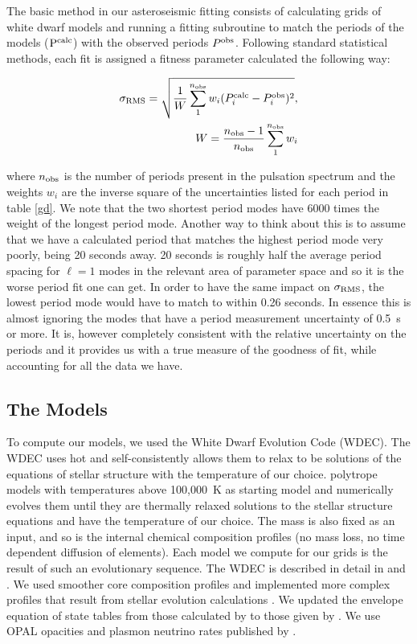 \documentclass[12pt,preprint]{aastex}
\begin{document}
The basic method in our asteroseismic fitting consists of calculating grids of white dwarf models and 
running a fitting subroutine to match the periods of the models ($\rm P^{calc}$) with the observed 
periods $P^{\rm obs}$. Following standard statistical methods, each fit is assigned a fitness 
parameter calculated the following way:

\begin{eqnarray}
\label{fiteq1}
\sigma_{\rm RMS} = \sqrt{\frac{1}{W} \sum_{1}^{n_{\rm obs}} {w_i(P^{\rm calc}_i-P^{\rm obs}_i)^2}}, \\
W=\frac{n_{\rm obs}-1}{n_{\rm obs}}\sum_{1}^{n_{\rm obs}}w_i
\end{eqnarray}

\noindent where $n_{\rm obs}$ is the number of periods present in the pulsation spectrum and the weights $w_i$ 
are the inverse square of the uncertainties listed for each period in table \ref{gd}. We note that the two 
shortest period modes have 6000 times the weight of the longest period mode. Another way to think about this 
is to assume that we have a calculated period that matches the highest period mode very poorly, 
being 20 seconds away. 20 seconds is roughly half the average period spacing for $\ell=1$ modes in the 
relevant area of parameter space and so it is the worse period fit one can get. In order to have the 
same impact on $\sigma_{\rm RMS}$, the lowest period mode would have to match to within 0.26 seconds. 
In essence this is almost ignoring the modes that have a period measurement uncertainty of 0.5~s or more. 
It is, however completely consistent with the relative uncertainty on the periods and it provides us with 
a true measure of the goodness of fit, while accounting for all the data we have.

\subsection{The Models}
\label{models}

To compute our models, we used the White Dwarf Evolution Code (WDEC). The WDEC uses hot  and self-consistently allows them to relax to be solutions of the equations of stellar structure with the temperature of our choice.
polytrope models with temperatures above 100{,}000~K as starting model and numerically evolves them until they are thermally relaxed 
solutions to the stellar structure equations and have the temperature of our choice. The mass is also fixed as an input, and so is the internal chemical composition profiles (no mass loss, no time dependent diffusion of elements). Each model we compute for our grids is the result 
of such an evolutionary sequence. The WDEC is described in detail in \citet{Lamb75} and 
\citet{Wood90}. We used smoother core composition profiles and implemented more complex profiles 
that result from stellar evolution calculations \citep{Salaris97}. We updated the envelope 
equation of state tables from those calculated by \citet{Fontaine77} to those given by 
\citet{Saumon95}. We use OPAL opacities \citep{Iglesias96} and plasmon neutrino rates 
published by \citet{Itoh96}. 
\end{document}
